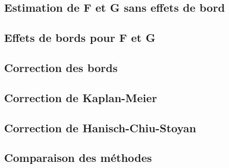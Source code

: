 \documentclass[french,12pt,a4paper]{report}
\begin{document}
\subsection{Estimation de F et G sans effets de bord}
\subsection{Effets de bords pour F et G}
\subsection{Correction des bords}
\subsection{Correction de Kaplan-Meier}
\subsection{Correction de Hanisch-Chiu-Stoyan}
\subsection{Comparaison des méthodes}
\end{document}
